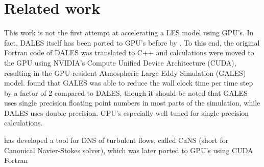 \section{Related work}

This work is not the first attempt at accelerating a LES model using GPU's. In fact, DALES itself has been ported to GPU's before by \citet{schalkwijkHighPerformanceSimulationsTurbulent2012}. To this end, the original Fortran code of DALES was translated to C++ and calculations were moved to the GPU using NVIDIA's Compute Unified Device Architecture (CUDA), resulting in the GPU-resident Atmospheric Large-Eddy Simulation (GALES) model. \citet{schalkwijkHighPerformanceSimulationsTurbulent2012} found that GALES was able to reduce the wall clock time per time step by a factor of 2 compared to DALES, though it should be noted that GALES uses single precision floating point numbers in most parts of the simulation, while DALES uses double precision. GPU's especially well tuned for single precision calculations. 

\citet{costaFFTbasedFinitedifferenceSolver2018} has developed a tool for DNS of turbulent flows, called CaNS (short for Canonical Navier-Stokes solver), which was later ported to GPU's using CUDA Fortran 

